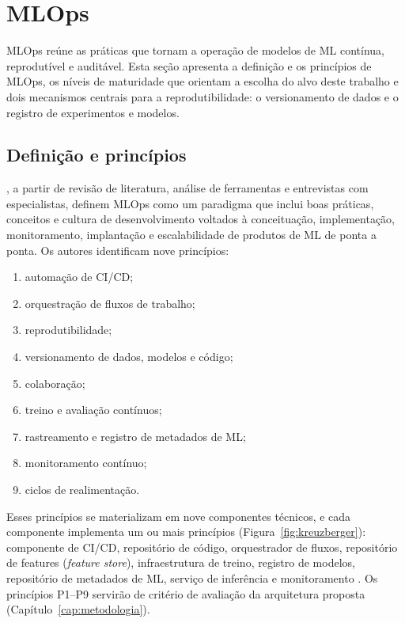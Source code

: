 \section{MLOps}
\label{sec:mlops}

MLOps reúne as práticas que tornam a operação de modelos de ML contínua, reprodutível e auditável. Esta seção apresenta a definição e os princípios de MLOps, os níveis de maturidade que orientam a escolha do alvo deste trabalho e dois mecanismos centrais para a reprodutibilidade: o versionamento de dados e o registro de experimentos e modelos.

\subsection{Definição e princípios}

, a partir de revisão de literatura, análise de ferramentas e entrevistas com especialistas, definem MLOps como um paradigma que inclui boas práticas, conceitos e cultura de desenvolvimento voltados à conceituação, implementação, monitoramento, implantação e escalabilidade de produtos de ML de ponta a ponta. Os autores identificam nove princípios:

\begin{enumerate}
	\item[P1] automação de CI/CD;
	\item[P2] orquestração de fluxos de trabalho;
	\item[P3] reprodutibilidade;
	\item[P4] versionamento de dados, modelos e código;
	\item[P5] colaboração;
	\item[P6] treino e avaliação contínuos;
	\item[P7] rastreamento e registro de metadados de ML;
	\item[P8] monitoramento contínuo;
	\item[P9] ciclos de realimentação.
\end{enumerate}

Esses princípios se materializam em nove componentes técnicos, e cada componente implementa um ou mais princípios (Figura~\ref{fig:kreuzberger}): componente de CI/CD, repositório de código, orquestrador de fluxos, repositório de features (\textit{feature store}), infraestrutura de treino, registro de modelos, repositório de metadados de ML, serviço de inferência e monitoramento \cite{kreuzberger2023}. Os princípios P1--P9 servirão de critério de avaliação da arquitetura proposta (Capítulo~\ref{cap:metodologia}).

